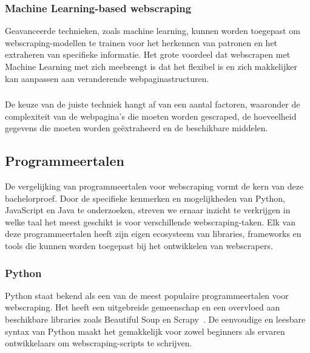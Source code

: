 \subsubsection{Machine Learning-based webscraping}
Geavanceerde technieken, zoals machine learning, kunnen worden toegepast om webscraping-modellen te trainen voor het herkennen 
van patronen en het extraheren van specifieke informatie. Het grote voordeel dat webscrapen met Machine Learning met zich meebrengt
is dat het flexibel is en zich makkelijker kan aanpassen aan veranderende webpaginastructuren.

\subsubsection*{}
De keuze van de juiste techniek hangt af van een aantal factoren, waaronder de complexiteit van de webpagina's 
die moeten worden gescraped, de hoeveelheid gegevens die moeten worden geëxtraheerd en de beschikbare middelen.

\subsection{Programmeertalen}
De vergelijking van programmeertalen voor webscraping vormt de kern van deze bachelorproef. 
Door de specifieke kenmerken en mogelijkheden van Python, JavaScript en Java te onderzoeken, 
streven we ernaar inzicht te verkrijgen in welke taal het meest geschikt is voor verschillende webscraping-taken. 
Elk van deze programmeertalen heeft zijn eigen ecosysteem van libraries, frameworks en tools die kunnen worden toegepast 
bij het ontwikkelen van webscrapers.

\subsubsection{Python}
Python staat bekend als een van de meest populaire programmeertalen voor webscraping. Het heeft een uitgebreide gemeenschap en
een overvloed aan beschikbare libraries zoals Beautiful Soup en Scrapy~\autocite{Saabith2019}. De eenvoudige en leesbare syntax van Python maakt het 
gemakkelijk voor zowel beginners als ervaren ontwikkelaars om webscraping-scripts te schrijven.

\subsubsection{}




